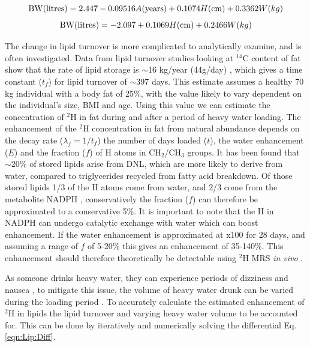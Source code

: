 \begin{equation}
    \textrm{BW(litres)} = 2.447-0.09516A\textrm{(years)}+0.1074H\textrm{(cm)}+0.3362W\textrm({kg})
    \label{eqn:Lip:male}
\end{equation}
\begin{equation}
    \textrm{BW(litres)} = -2.097+0.1069H\textrm{(cm)}+0.2466W\textrm({kg})
    \label{eqn:Lip:female}
\end{equation}

The change in lipid turnover is more complicated to analytically examine, and is often investigated. Data from lipid turnover studies looking at $^{14}$C content of fat show that the rate of lipid storage is $\sim$16 kg/year (44g/day) \cite{Arner2011DynamicsDisease, Spalding2017ImpactTissue}, which gives a time constant ($t_f$) for lipid turnover of $\sim$397 days. This estimate assumes a healthy 70 kg individual with a body fat of 25\%, with the value likely to vary dependent on the individual's size, \ac{BMI} and age. Using this value we can estimate the concentration of $^2$H in fat during and after a period of heavy water loading. The enhancement of the $^2$H concentration in fat from natural abundance depends on the decay rate ($\lambda_f = 1/t_f$) the number of days loaded ($t$), the water enhancement ($E$) and the fraction ($f$) of H atoms in CH$_2$/CH$_3$ groups. It has been found that $\sim$20\% of stored lipids arise from \ac{DNL}, which are more likely to derive from water, compared to triglycerides recycled from fatty acid breakdown. Of those stored lipids 1/3 of the H atoms come from water, and 2/3 come from the metabolite NADPH \cite{Zhang2017ChemicalNADPH}, conservatively the fraction ($f$) can therefore be approximated to a conservative 5\%. It is important to note that the H in NADPH can undergo catalytic exchange with water which can boost enhancement. If the water enhancement is approximated at x100 for 28 days, and assuming a range of $f$ of 5-20\% this gives an enhancement of 35-140\%. This enhancement should therefore theoretically be detectable using $^2$H MRS \textit{in vivo} \cite{Brereton1986PreliminarySpectroscopy}. 

As someone drinks heavy water, they can experience periods of dizziness and nausea \cite{Money1974HeavyAlcohol}, to mitigate this issue, the volume of heavy water drunk can be varied during the loading period \cite{Strawford2004AdiposeO, Cocking2023DeuteriumDosing}. To accurately calculate the estimated enhancement of $^2$H in lipids the lipid turnover and varying heavy water volume to be accounted for. This can be done by iteratively and numerically solving the differential Eq. \ref{eqn:Lip:Diff}.


